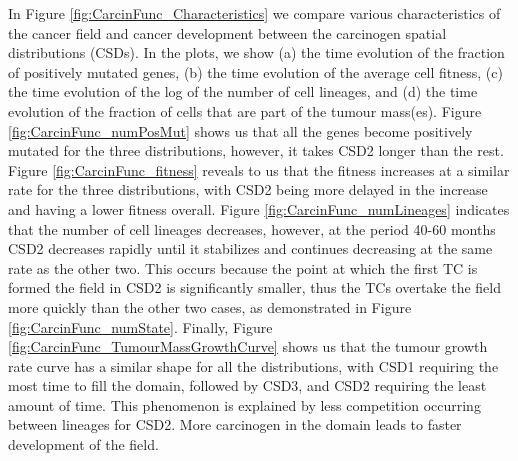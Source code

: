 \documentclass[\main/thesis.tex]{subfiles}
\begin{document}
In Figure \ref{fig:CarcinFunc_Characteristics} we compare various characteristics of the cancer field and cancer development between the carcinogen spatial distributions (CSDs). In the plots, we show (a) the time evolution of the fraction of positively mutated genes, (b) the time evolution of the average cell fitness, (c) the time evolution of the log of the number of cell lineages, and (d) the time evolution of the fraction of cells that are part of the tumour mass(es).
Figure \ref{fig:CarcinFunc_numPosMut} shows us that all the genes become positively mutated for the three distributions, however, it takes CSD2 longer than the rest. Figure \ref{fig:CarcinFunc_fitness} reveals to us that the fitness increases at a similar rate for the three distributions, with CSD2 being more delayed in the increase and having a lower fitness overall. Figure \ref{fig:CarcinFunc_numLineages} indicates that the number of cell lineages decreases, however, at the period 40-60 months CSD2 decreases rapidly until it stabilizes and continues decreasing at the same rate as the other two. This occurs because the point at which the first TC is formed the field in CSD2 is significantly smaller, thus the TCs overtake the field more quickly than the other two cases, as demonstrated in Figure \ref{fig:CarcinFunc_numState}. Finally, Figure \ref{fig:CarcinFunc_TumourMassGrowthCurve} shows us that the tumour growth rate curve has a similar shape for all the distributions, with CSD1 requiring the most time to fill the domain, followed by CSD3, and CSD2 requiring the least amount of time. This phenomenon is explained by less competition occurring between lineages for CSD2. More carcinogen in the domain leads to faster development of the field.
\end{document}
